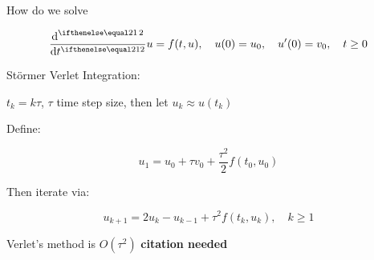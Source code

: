 How do we solve 

$$\der[2]{}{t} u = f(t,u), \quad u(0) = u_0, \quad u'(0) = v_0, \quad t \geq 0$$

St\"ormer Verlet Integration:

$t_k = k\tau$, $\tau$ time step size, then let $u_k \approx u(t_k)$

Define:

$$u_1 = u_0 + \tau v_0 + \frac{\tau^2}{2} f(t_0,u_0)$$

Then iterate via:

$$u_{k+1} = 2u_{k} - u_{k-1} + \tau^2 f(t_k,u_k), \quad k \geq 1$$

Verlet's method is $O(\tau^2)$ \textbf{citation needed}